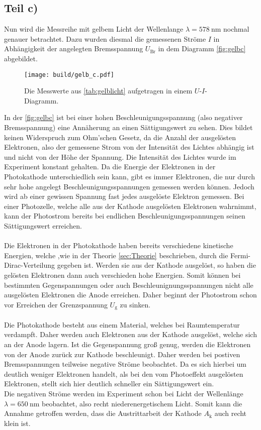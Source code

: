 \subsection{Teil c)}
Nun wird die Messreihe mit gelbem Licht der Wellenlange $\lambda = \SI{578}{\nano\metre}$ nochmal genauer betrachtet.
Dazu wurden diesmal die gemessenen Ströme $I$ in Abhängigkeit der angelegten Bremsspannung $U_{\text{Br}}$ in dem Diagramm \autoref{fig:gelbc} abgebildet.
\begin{figure}[H]
  \centering
  \texttt{[image: build/gelb\_c.pdf]}
  \caption{Die Messwerte aus \autoref{tab:gelblicht} aufgetragen in einem $U$-$I$- Diagramm.}
  \label{fig:gelbc}
\end{figure}
\noindent
In der \autoref{fig:gelbc} ist bei einer hohen Beschleunigungsspannung (also negativer Bremsspannung) eine Annäherung an einen Sättigungswert zu sehen.
Dies bildet keinen Widerspruch zum Ohm'schen Gesetz, da die Anzahl der ausgelösten Elektronen, also der gemessene Strom von der Intensität des Lichtes abhängig ist und nicht von der Höhe der Spannung.
Die Intensität des Lichtes wurde im Experiment konstant gehalten.
Da die Energie der Elektronen in der Photokathode unterschiedlich sein kann, gibt es immer Elektronen, die nur durch sehr hohe angelegt Beschleunigungsspannungen gemessen werden können.
Jedoch wird ab einer gewissen Spannung fast jedes ausgelöste Elektron gemessen.
Bei einer Photozelle, welche alle aus der Kathode ausgelösten Elektronen wahrnimmt,  kann der Photostrom bereits bei endlichen Beschleunigungsspannungen seinen Sättigungswert erreichen.\\
\\
Die Elektronen in der Photokathode haben bereits verschiedene kinetische Energien, welche ,wie in der Theorie \ref{sec:Theorie} beschrieben, durch die Fermi-Dirac-Verteilung gegeben ist.
Werden sie aus der Kathode ausgelöst, so haben die gelösten Elektronen dann auch verschieden hohe Energien.
Somit können bei bestimmten Gegenspannungen oder auch Beschleunignungsspannungen nicht alle ausgelösten Elektronen die Anode erreichen.
Daher beginnt der Photostrom schon vor Erreichen der Grenzspannung $U_{\text{g}}$ zu sinken. \\
\\
Die Photokathode besteht aus einem Material, welches bei Raumtemperatur verdampft.
Daher werden auch Elektronen aus der Kathode ausgelöst, welche sich an der Anode lagern.
Ist die Gegenspannung  groß genug, werden die Elektronen von der Anode zurück zur Kathode beschleunigt.
Daher werden bei postiven Bremsspannungen teilweise negative Ströme beobachtet.
Da es sich hierbei um deutlich weniger Elektronen handelt, als bei den vom Photoeffekt ausgelösten Elektronen, stellt sich hier deutlich schneller ein Sättigungswert ein.\\
Die negativen Ströme werden im Experiment schon bei Licht der Wellenlänge $\lambda = \SI{650}{\nano\metre}$ beobachtet, also recht niederenergetischem Licht.
Somit kann die Annahme  getroffen werden, dass die Austrittarbeit der Kathode $A_{\text{k}}$ auch recht klein ist.

